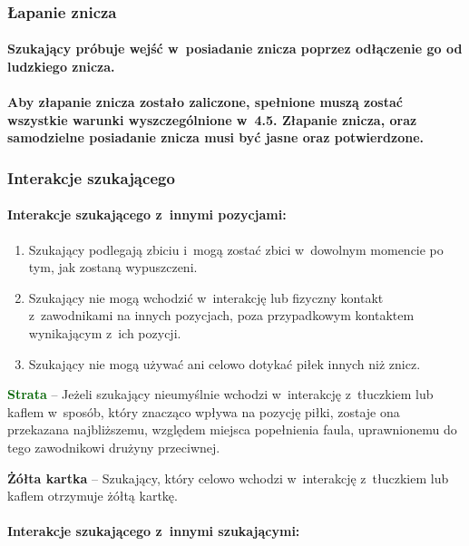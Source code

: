 \documentclass[12pt,a4paper]{article}
\newcommand\yellowcard[1]{\bgroup\textcolor{darkyellow}{\textbf{#1}}}
\newcommand\other[1]{\bgroup\textcolor{darkgreen}{\textbf{#1}}}
\begin{document}
\subsubsection{Łapanie znicza}

\paragraph{Szukający próbuje wejść w~posiadanie znicza poprzez
	odłączenie go od ludzkiego znicza.}

\paragraph{Aby złapanie znicza zostało zaliczone, spełnione muszą
	zostać wszystkie warunki wyszczególnione w~4.5. Złapanie znicza, oraz
	samodzielne posiadanie znicza musi być jasne oraz potwierdzone.}

\subsubsection{Interakcje szukającego}

\paragraph{Interakcje szukającego z~innymi pozycjami: }

\begin{enumerate}
	\item
	      Szukający podlegają zbiciu i~mogą zostać zbici w~dowolnym momencie po
	      tym, jak zostaną wypuszczeni.
	\item
	      Szukający nie mogą wchodzić w~interakcję lub fizyczny kontakt z~zawodnikami na innych pozycjach, poza przypadkowym kontaktem
	      wynikającym z~ich pozycji.
	\item
	      Szukający nie mogą używać ani celowo dotykać piłek innych niż znicz.
\end{enumerate}

\other{Strata} -- Jeżeli szukający nieumyślnie wchodzi w~interakcję z~tłuczkiem lub kaflem w~sposób, który znacząco wpływa na pozycję piłki,
zostaje ona przekazana najbliższemu, względem miejsca popełnienia faula,
uprawnionemu do tego zawodnikowi drużyny przeciwnej.

\yellowcard{Żółta kartka} -- Szukający, który celowo wchodzi w~interakcję z~tłuczkiem lub kaflem otrzymuje żółtą kartkę.

\paragraph{Interakcje szukającego z~innymi szukającymi:}
\end{document}
